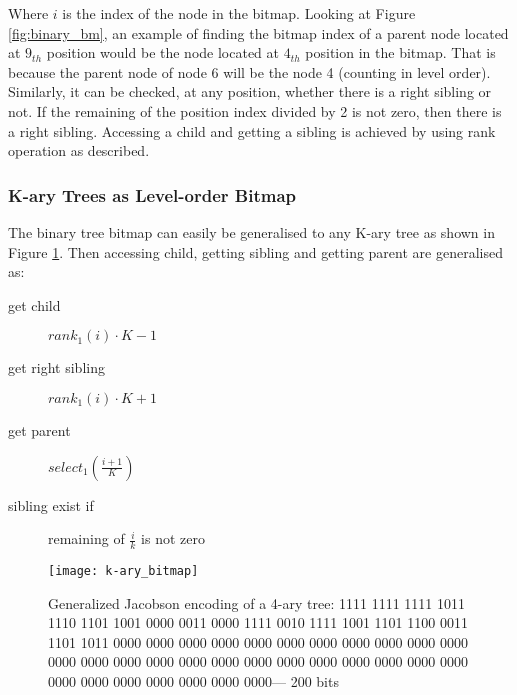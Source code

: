 Where \(i\) is the index of the node in the bitmap. Looking at Figure \ref{fig:binary_bm}, an example of finding the bitmap index of a parent node located at $9_{th}$ position would be the node located at $4_{th}$ position in the bitmap. That is because the parent node of  node 6 will be the node 4 (counting in level order). Similarly, it can be checked, at any position, whether there is a right sibling or not. If the remaining of the position index divided by 2 is not zero, then there is a right sibling. Accessing a child and getting a sibling is achieved by using rank operation as described.

\subsubsection*{K-ary Trees as Level-order Bitmap}
The binary tree bitmap can easily be generalised to any K-ary tree as shown in Figure \ref{fig:k-ary-bm}. Then accessing child, getting sibling and getting parent are generalised as:

\begin{description}
	\item [get child] \(rank_1(i) \cdot K - 1\)
	\item [get right sibling] \(rank_1(i) \cdot K + 1\)
	\item [get parent] \(select_1(\frac{i + 1}{K} )\)
	\item [sibling exist if] remaining of \(\frac{i}{k}\) is not zero
\end{description}

\begin{figure}
	 \centering
    \texttt{[image: k-ary\_bitmap]}
    \caption{Generalized Jacobson encoding of a 4-ary tree: 1111 1111 1111 1011 1110 1101 1001 0000 0011 0000 1111 0010 1111 1001 1101 1100 0011 1101 1011 0000 0000 0000 0000 0000 0000 0000 0000 0000 0000 0000 0000 0000 0000 0000 0000 0000 0000 0000 0000 0000 0000 0000 0000 0000 0000 0000 0000 0000 0000 0000--- 200 bits}
    \label{fig:k-ary-bm}
\end{figure}

